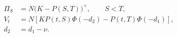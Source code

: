 \documentclass{equation-sheet}
\begin{document}
\begin{equation*}
\begin{aligned}
\Pi_S &= N\bigl(K-P(S,T)\bigr)^+, \qquad S<T, \\[0.75em]
V_t
  &= N\left[K P(t,S)\Phi(-d_2)
     -P(t,T)\Phi(-d_1)\right], \\[0.55em]
d_2 &= d_1-\nu.
\end{aligned}
\end{equation*}
\end{document}
